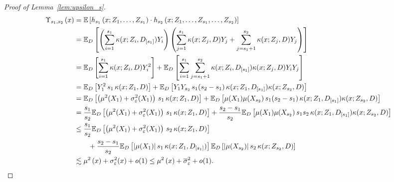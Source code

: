 \begin{proof}[Proof of Lemma~\ref{lem:upsilon_s}]
	\begin{equation}
		\begin{aligned}
			\Upsilon_{s_1, s_2}\left(x\right)
			 & = \mathbb{E}\left[h_{s_1}\left(x; Z_1, \ldots,  Z_{s_1}\right) \cdot
			h_{s_2}\left(x; Z_1, \ldots,Z_{s_1}, \ldots, Z_{s_2}\right)\right]                                                                             \\
			 & = \mathbb{E}_{D}\left[
				\left(\sum_{i = 1}^{s_1} \kappa(x; Z_{i}, D_{[s_1]})Y_{i}\right)
				\left(\sum_{j = 1}^{s_1}\kappa(x; Z_{j}, D)Y_j + \sum_{j = s_1 + 1}^{s_2}\kappa(x; Z_{j}, D)Y_j\right)
			\right]                                                                                                                                                                            \\
			 & = \mathbb{E}_{D}\left[\sum_{i = 1}^{s_1} \kappa(x; Z_{i}, D) Y_{i}^2\right]
			+ \mathbb{E}_{D}\left[\sum_{i = 1}^{s_1}\sum_{j = s_1 + 1}^{s_2}\kappa(x; Z_{i}, D_{[s_1]})\kappa(x; Z_{j}, D) Y_{i} Y_j\right]                              \\
			 & = \mathbb{E}_{D}\left[Y_1^2 \, s_1 \, \kappa(x; Z_1, D)\right]
			+ \mathbb{E}_{D}\left[Y_{1} Y_{s_2} \, s_1 (s_2 - s_1) \, \kappa(x; Z_1, D_{[s_1]})\kappa(x; Z_{s_2}, D)\right]                                        \\
			 & = \mathbb{E}_{D}\left[\left(\mu^2(X_1) + \sigma^2_{\varepsilon}(X_1)\right) \, s_1 \, \kappa(x; Z_1, D)\right]
			+ \mathbb{E}_{D}\left[\mu(X_1) \mu(X_{s_2}) \, s_1 (s_2 - s_1) \, \kappa(x; Z_1, D_{[s_1]})\kappa(x; Z_{s_2}, D)\right]              \\
			 & = \frac{s_1}{s_2}\mathbb{E}_{D}\left[\left(\mu^2(X_1) + \sigma^2_{\varepsilon}(X_1)\right) \, s_1 \, \kappa(x; Z_1, D)\right]
			+ \frac{s_2 - s_1}{s_2}\mathbb{E}_{D}\left[\mu(X_1) \mu(X_{s_2}) \, s_1 s_2 \, \kappa(x; Z_1, D_{[s_1]})\kappa(x; Z_{s_2}, D)\right] \\
			 & \leq \frac{s_1}{s_2} \mathbb{E}_{D}\left[\left(\mu^2(X_1) + \sigma^2_{\varepsilon}(X_1)\right) \, s_2 \, \kappa(x; Z_1, D)\right]                   \\
			 & \quad \quad + \frac{s_2 - s_1}{s_2}\mathbb{E}_{D}\left[|\mu(X_1)| \, s_1 \, \kappa(x; Z_1, D_{[s_1]})\right]
			\mathbb{E}_{D}\left[|\mu(X_{s_2})| \, s_2 \, \kappa(x; Z_{s_2}, D)\right]                                                                                       \\
			 & \lesssim \mu^{2}\left(x\right) + \sigma^2_{\varepsilon}(x) + o(1)
			\leq \mu^{2}\left(x\right) + \overline{\sigma}^2_{\varepsilon} + o(1).
		\end{aligned}
	\end{equation}
\end{proof}


